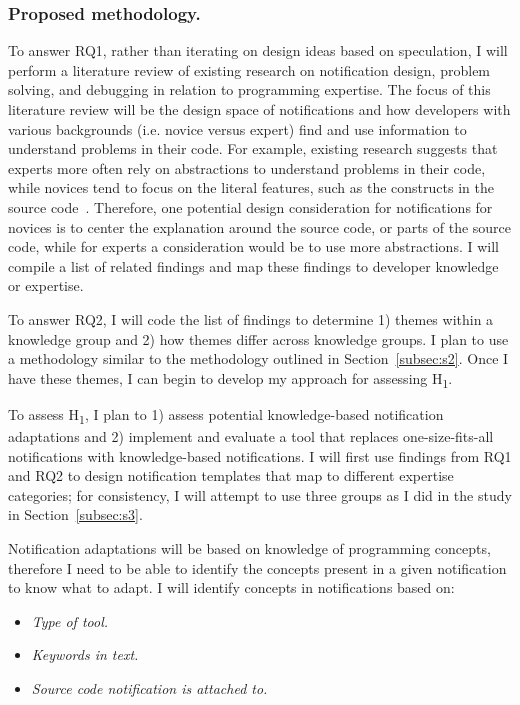 \documentclass{llncs}
\begin{document}
\subsubsection{Proposed methodology.}
To answer RQ1, rather than iterating on design ideas based on speculation, I will perform a literature review of existing research on notification design, problem solving, and debugging in relation to programming expertise. The focus of this literature review will be the design space of notifications and how developers with various backgrounds (i.e. novice versus expert) find and use information to understand problems in their code. For example, existing research suggests that experts more often rely on abstractions to understand problems in their code, while novices tend to focus on the literal features, such as the constructs in the source code~\cite{Weiser:1983:Representation}. Therefore, one potential design consideration for notifications for novices is to center the explanation around the source code, or parts of the source code, while for experts a consideration would be to use more abstractions. I will compile a list of related findings and map these findings to developer knowledge or expertise.

To answer RQ2, I will code the list of findings to determine 1) themes within a knowledge group and 2) how themes differ across knowledge groups. I plan to use a methodology similar to the methodology outlined in Section~\ref{subsec:s2}. Once I have these themes, I can begin to develop my approach for assessing H\textsubscript{1}. 

To assess H\textsubscript{1}, I plan to 1) assess potential knowledge-based notification adaptations and 2) implement and evaluate a tool that replaces one-size-fits-all notifications with knowledge-based notifications. 
I will first use findings from RQ1 and RQ2 to design notification templates that map to different expertise categories; for consistency, I will attempt to use three groups as I did in the study in Section~\ref{subsec:s3}.

Notification adaptations will be based on knowledge of programming concepts, therefore I need to be able to identify the concepts present in a given notification to know what to adapt. 
I will identify concepts in notifications based on:
\begin{itemize}
	\item \textit{Type of tool.}
	\item \textit{Keywords in text.} %
	\item \textit{Source code notification is attached to.} %
\end{itemize}
\end{document}

